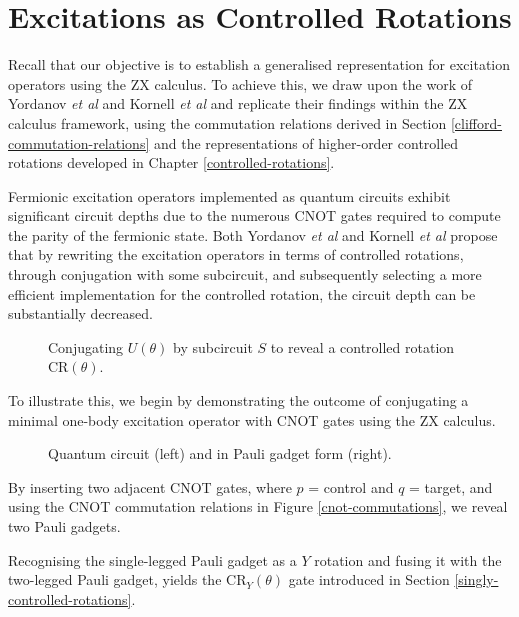 \section{Excitations as Controlled Rotations}%
\label{operator-controlled-rotations}

Recall that our objective is to establish a generalised representation for excitation operators using the ZX calculus. To achieve this, we draw upon the work of Yordanov \textit{et al} \cite{Yordanov2020} and Kornell \textit{et al} \cite{Kornell2023} and replicate their findings within the ZX calculus framework, using the commutation relations derived in Section \ref{clifford-commutation-relations} and the representations of higher-order controlled rotations developed in Chapter \ref{controlled-rotations}.

Fermionic excitation operators implemented as quantum circuits exhibit significant circuit depths due to the numerous CNOT gates required to compute the parity of the fermionic state. Both Yordanov \textit{et al} and Kornell \textit{et al} propose that by rewriting the excitation operators in terms of controlled rotations, through conjugation with some subcircuit, and subsequently selecting a more efficient implementation for the controlled rotation, the circuit depth can be substantially decreased.

\begin{figure}[H]
    \centering
    \caption{Conjugating $U(\theta)$ by subcircuit $S$ to reveal a controlled rotation CR$(\theta)$.}
\end{figure}

To illustrate this, we begin by demonstrating the outcome of conjugating a minimal one-body excitation operator with CNOT gates using the ZX calculus.

\begin{figure}[H]
    \centering
    \caption{Quantum circuit (left) and in Pauli gadget form (right).}
    \label{minimal-one-body}
\end{figure}

By inserting two adjacent CNOT gates, where $p$ = control and $q$ = target, and using the CNOT commutation relations in Figure \ref{cnot-commutations}, we reveal two Pauli gadgets.


Recognising the single-legged Pauli gadget as a $Y$ rotation and fusing it with the two-legged Pauli gadget, yields the CR$_Y(\theta)$ gate introduced in Section \ref{singly-controlled-rotations}.

